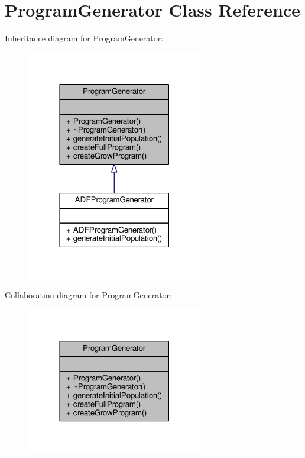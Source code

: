 \hypertarget{classProgramGenerator}{}\section{Program\+Generator Class Reference}
\label{classProgramGenerator}


Inheritance diagram for Program\+Generator\+:
\nopagebreak
\begin{figure}[H]
\begin{center}
\leavevmode
\includegraphics[width=218pt]{classProgramGenerator__inherit__graph}
\end{center}
\end{figure}


Collaboration diagram for Program\+Generator\+:
\nopagebreak
\begin{figure}[H]
\begin{center}
\leavevmode
\includegraphics[width=218pt]{classProgramGenerator__coll__graph}
\end{center}
\end{figure}
